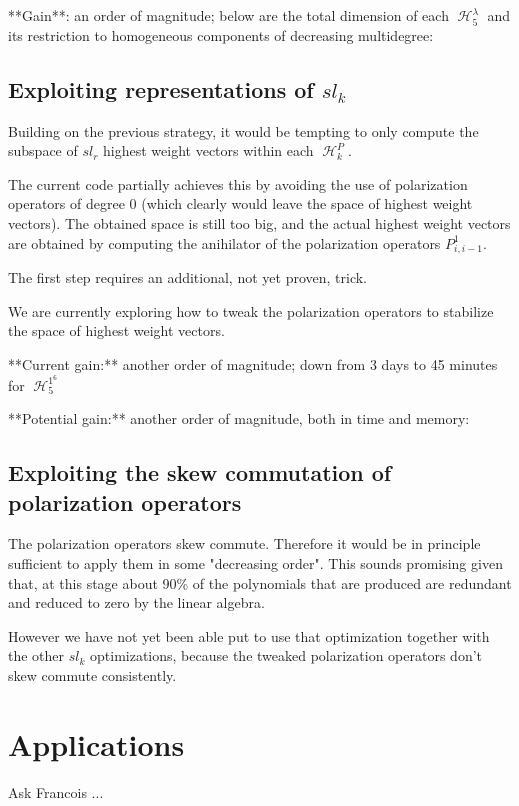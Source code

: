 \documentclass[letter,12pt]{article}
\DeclareMathOperator{\harmonics}{\mathcal{H}}
\begin{document}
	**Gain**: an order of magnitude; below are the total dimension of each $\harmonics_5^\lambda$ and its restriction to homogeneous components of decreasing multidegree:
	
	\subsection{Exploiting representations of $sl_k$}
	
	Building on the previous strategy, it would be tempting to only compute the subspace of $sl_r$ highest weight vectors within each $\harmonics_k^P$.
	
	The current code partially achieves this by avoiding the use of polarization operators of degree $0$ (which clearly would leave the space of highest weight vectors). The obtained space is still too big, and the actual highest weight vectors are obtained by computing the anihilator of the polarization operators $P_{i,i-1}^1$.
	
	The first step requires an additional, not yet proven, trick.
	
	We are currently exploring how to tweak the polarization operators to stabilize the space of highest weight vectors.
	
	**Current gain:** another order of magnitude; down from 3 days to 45 minutes for $\harmonics_5^{1^6}$
	
	**Potential gain:** another order of magnitude, both in time and memory:
	
	\subsection{Exploiting the skew commutation of polarization operators}
	
	The polarization operators skew commute. Therefore it would be in principle sufficient to apply them in some "decreasing order". This sounds promising given that, at this stage about 90\% of the polynomials that are produced are redundant and reduced to zero by the linear algebra.
	
	However we have not yet been able put to use that optimization together with the other $sl_k$ optimizations, because the tweaked polarization operators don't skew commute consistently.
	
	\section{Applications}
	Ask Francois ... 
	

\nocite{*}

\end{document}
